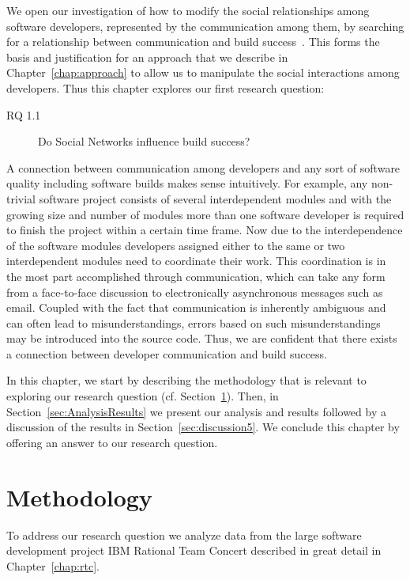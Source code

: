 \label{chap:soc-net}
We open our investigation of how to modify the social relationships among software developers, represented by the communication among them, by searching for a relationship between communication and build success~\cite{wolf:icse:2009}.
This forms the basis and justification for an approach that we describe in Chapter~\ref{chap:approach} to allow us to manipulate the social interactions among developers.
Thus this chapter explores our first research question:
\begin{description}
\item[RQ 1.1] Do Social Networks influence build success?
\end{description}

A connection between communication among developers and any sort of software quality including software builds makes sense intuitively.
For example, any non-trivial software project consists of several interdependent modules and with the growing size and number of modules more than one software developer is required to finish the project within a certain time frame.
Now due to the interdependence of the software modules developers assigned either to the same or two interdependent modules need to coordinate their work.
This coordination is in the most part accomplished through communication, which can take any form from a face-to-face discussion to electronically asynchronous messages such as email.
Coupled with the fact that communication is inherently ambiguous and can often lead to misunderstandings, errors based on such misunderstandings may be introduced into the source code.
Thus, we are confident that there exists  a connection between developer communication and build success.

In this chapter, we start by describing the methodology that is relevant to exploring our research question (cf. Section~\ref{sec:Methodology}).
Then, in Section~\ref{sec:AnalysisResults} we present our analysis and results followed by a discussion of the results in Section~\ref{sec:discussion5}.
We conclude this chapter by offering an answer to our research question.


\section{Methodology}
\label{sec:Methodology}
To address our research question we analyze data from the large software
development project IBM Rational Team Concert described in great detail in Chapter~\ref{chap:rtc}.

